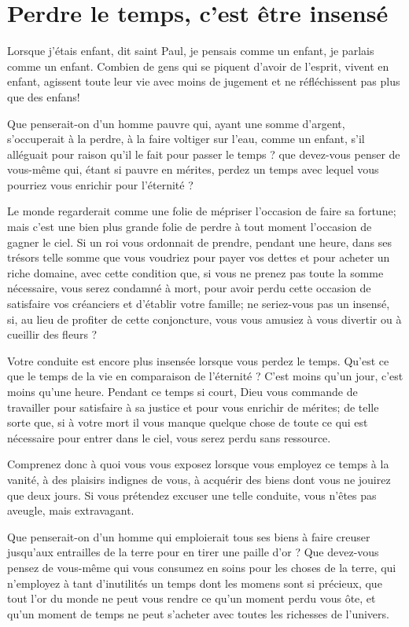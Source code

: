 \documentclass[instructions.tex]{subfiles}
\begin{document}
 
\chapter{Perdre le temps, c'est être insensé}
 

\primo Lorsque j'étais enfant, dit saint Paul, je pensais comme un enfant, je parlais comme un enfant. Combien de gens qui se piquent d'avoir de l'esprit, vivent en enfant, agissent toute leur vie avec moins de jugement et ne réfléchissent pas plus que des enfans! 

Que penserait-on d'un homme pauvre qui, ayant une somme d'argent, s'occuperait à la perdre, à la faire voltiger sur l'eau, comme un enfant, s'il alléguait pour raison qu'il le fait pour passer le temps ? que devez-vous penser de vous-même qui, étant si pauvre en mérites, perdez un temps avec lequel vous pourriez vous enrichir pour l'éternité ? 
 
 Le monde regarderait comme une folie de mépriser l'occasion de faire sa fortune; mais c'est une bien plus grande folie de perdre à tout moment l'occasion de gagner le ciel. Si un roi vous ordonnait de prendre, pendant une heure, dans ses trésors telle somme que vous voudriez pour payer vos dettes et pour acheter un riche domaine, avec cette condition que, si vous ne prenez pas toute la somme nécessaire, vous serez condamné à mort, pour avoir perdu cette occasion de satisfaire vos créanciers et d'établir votre famille; ne seriez-vous pas un insensé, si, au lieu de profiter de cette conjoncture, vous vous amusiez à vous divertir ou à cueillir des fleurs ?

 Votre conduite est encore plus insensée lorsque vous perdez le temps. Qu'est ce que le temps de la vie en comparaison de l'éternité ? C'est moins qu'un jour, c'est moins qu'une heure. Pendant ce temps si court, Dieu vous commande de travailler pour satisfaire à sa justice et pour vous enrichir de mérites; de telle sorte que, si à votre mort il vous manque quelque chose de toute ce qui est nécessaire pour entrer dans le ciel, vous serez perdu sans ressource. 

 Comprenez donc à quoi vous vous exposez lorsque vous employez ce temps à la vanité, à des plaisirs indignes de vous, à acquérir des biens dont vous ne jouirez que deux jours. Si vous prétendez excuser une telle conduite, vous n'êtes pas aveugle, mais extravagant. 

 Que penserait-on d'un homme qui emploierait tous ses biens à faire creuser jusqu'aux entrailles de la terre pour en tirer une paille d'or ? Que devez-vous pensez de vous-même qui vous consumez en soins pour les choses de la terre, qui n'employez à tant d'inutilités un temps dont les momens sont si précieux, que tout l'or du monde ne peut vous rendre ce qu'un moment perdu vous ôte, et qu'un moment de temps ne peut s'acheter avec toutes les richesses de l'univers. 
\end{document}
